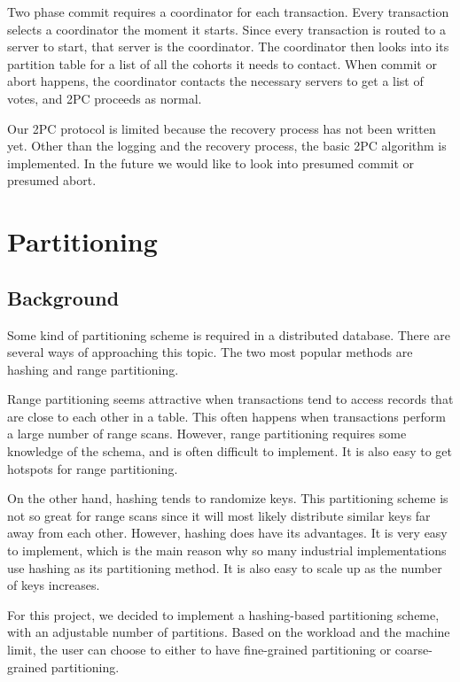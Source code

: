 \documentclass[a4paper, 10pt, notitlepage]{report}
\begin{document}
Two phase commit requires a coordinator for each transaction. Every transaction selects a coordinator the moment
it starts. Since every transaction is routed to a server to start, that server is the coordinator. The coordinator then looks
into its partition table for a list of all the cohorts it needs to contact. When commit or abort happens, the coordinator
contacts the necessary servers to get a list of votes, and 2PC proceeds as normal.

Our 2PC protocol is limited because the recovery process has not been written yet. Other than the logging and the recovery
process, the basic 2PC algorithm is implemented. In the future we would like to look into presumed commit or presumed abort.

\section*{Partitioning}

\subsection*{Background}

Some kind of partitioning scheme is required in a distributed database. There are several ways of approaching
this topic. The two most popular methods are hashing and range partitioning.

Range partitioning seems attractive when transactions tend to access records that are close to each other
in a table. This often happens when transactions perform a large number of range scans. However, range partitioning
requires some knowledge of the schema, and is often difficult to implement. It is also easy to get hotspots for
range partitioning.

On the other hand, hashing tends to randomize keys. This partitioning scheme is not so great for range scans
since it will most likely distribute similar keys far away from each other. However, hashing does have its advantages.
It is very easy to implement, which is the main reason why so many industrial implementations use hashing as its
partitioning method. It is also easy to scale up as the number of keys increases. 

For this project, we decided to implement a hashing-based partitioning scheme, with an adjustable number of partitions.
Based on the workload and the machine limit, the user can choose to either to have fine-grained partitioning or
coarse-grained partitioning.
\end{document}
